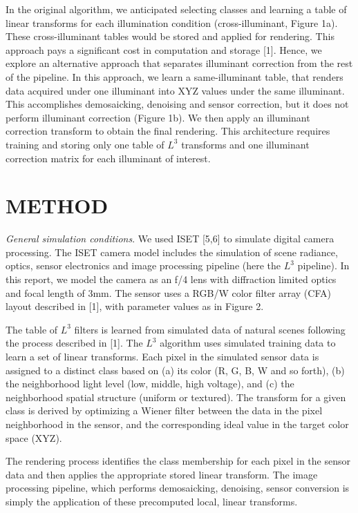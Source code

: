 \documentclass[]{spie}
\begin{document}
In the original algorithm, we anticipated selecting classes and learning a table of linear transforms for each illumination condition (cross-illuminant, Figure 1a).  These cross-illuminant tables would be stored and applied for rendering. This approach pays a significant cost in computation and storage [1]. Hence, we explore an alternative approach that separates illuminant correction from the rest of the pipeline. In this approach, we learn a same-illuminant table, that renders data acquired under one illuminant into XYZ values under the same illuminant.  This accomplishes demosaicking, denoising and sensor correction, but it does not perform illuminant correction (Figure 1b). We then apply an illuminant correction transform to obtain the final rendering. This architecture requires training and storing only one table of $L^3$ transforms and one illuminant correction matrix for each illuminant of interest. 

\section{METHOD}

\textit{General simulation conditions}. We used ISET [5,6] to simulate digital camera processing. The ISET camera model includes the simulation of scene radiance, optics, sensor electronics and image processing pipeline (here the $L^3$ pipeline). In this report, we model the camera as an f/4 lens with diffraction limited optics and focal length of 3mm. The sensor uses a RGB/W color filter array (CFA) layout described in [1], with parameter values as in Figure 2.  

The table of $L^3$ filters is learned from simulated data of natural scenes following the process described in [1].  The $L^3$ algorithm uses simulated training data to learn a set of linear transforms. Each pixel in the simulated sensor data is assigned to a distinct class based on (a) its color (R, G, B, W and so forth), (b) the neighborhood light level (low, middle, high voltage), and (c) the neighborhood spatial structure (uniform or textured).  The transform for a given class is derived by optimizing a Wiener filter between the data in the pixel neighborhood in the sensor, and the corresponding ideal value in the target color space (XYZ). 

The rendering process identifies the class membership for each pixel in the sensor data and then applies the appropriate stored linear transform. The image processing pipeline, which performs demosaicking, denoising, sensor conversion is simply the application of these precomputed local, linear transforms. 
\end{document}
